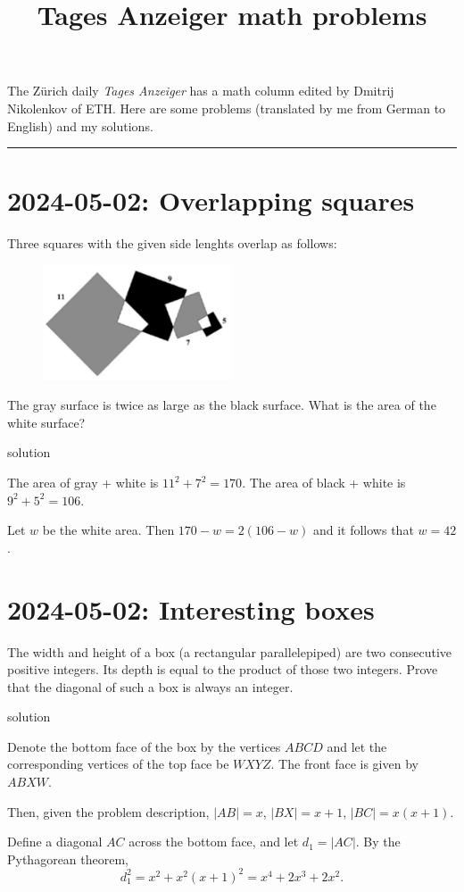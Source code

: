 \documentclass[11pt, oneside]{amsart}
\title{Tages Anzeiger math problems}
\newcommand{\problem}[2]{\section*{#1: #2}}
\newcommand{\solution}[0]{{\sc solution}}
\begin{document}
\maketitle

The Zürich daily {\em Tages Anzeiger} has a math column edited by
Dmitrij Nikolenkov of ETH. Here are some problems (translated by me
from German to English) and my solutions.

\vspace{2em}\hrule\vspace{2em}

\problem{2024-05-02}{Overlapping squares}

Three squares with the given side lenghts overlap as follows:

\begin{figure}[!h] 
    \centering
    \includegraphics[width=0.5\textwidth]{squares.png}
\end{figure}

The gray surface is twice as large as the black surface. What is the area of the white surface?

\solution

The area of gray + white is $11^2 + 7^2 = 170$. The area of black + white is $9^2+5^2 = 106$.

Let $w$ be the white area. Then $170 - w =  2(106-w)$ and it follows that $w = 42$.

\newpage
\problem{2024-05-02}{Interesting boxes}

The width and height of a box (a rectangular parallelepiped) are two consecutive
positive integers. Its depth is equal to the product of those two integers.
Prove that the diagonal of such a box is always an integer.

\solution

Denote the bottom face of the box by the vertices $ABCD$ and let the corresponding
vertices of the top face be $WXYZ$. The front face is given by $ABXW$.

Then, given the problem description, $|AB| = x$, $|BX| = x+1$, $|BC| = x(x+1)$.

Define a diagonal $AC$ across the bottom face, and let $d_1 = |AC|$.
By the Pythagorean theorem,
\[ d_1^2 = x^2 + x^2(x+1)^2 = x^4 + 2x^3 + 2x^2. \]
\end{document}
